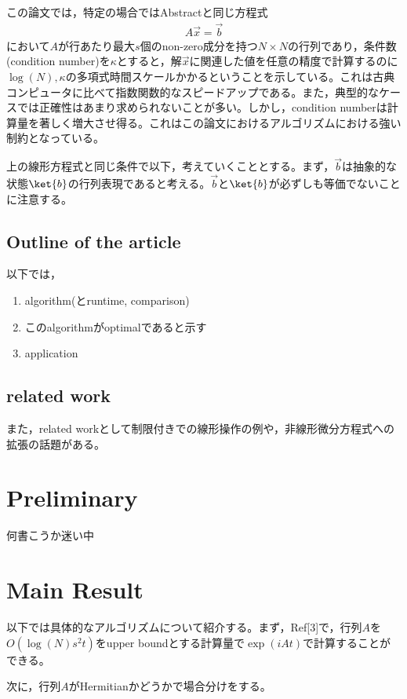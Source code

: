 \documentclass[b5paper,papersize,fleqn]{jsarticle}
\begin{document}
この論文では，特定の場合ではAbstractと同じ方程式
\begin{eqnarray}
  A\vec{x} = \vec{b}
\end{eqnarray}
において$A$が行あたり最大$s$個のnon-zero成分を持つ$N\times N$の行列であり，条件数(condition number)を$\kappa $とすると，解$\vec{x}$に関連した値を任意の精度で計算するのに$\log(N),\kappa $の多項式時間スケールかかるということを示している。これは古典コンピュータに比べて指数関数的なスピードアップである。また，典型的なケースでは正確性はあまり求められないことが多い。しかし，condition numberは計算量を著しく増大させ得る。これはこの論文におけるアルゴリズムにおける強い制約となっている。

上の線形方程式と同じ条件で以下，考えていくこととする。まず，$\vec{b}$は抽象的な状態$\ket{b}$の行列表現であると考える。$\vec{b}$と$\ket{b}$が必ずしも等価でないことに注意する。

\subsection{Outline of the article}

以下では，
\begin{enumerate}
  \item algorithm(とruntime, comparison)
  \item このalgorithmがoptimalであると示す
  \item application
\end{enumerate}

\subsection{related work}

また，related workとして制限付きでの線形操作の例や，非線形微分方程式への拡張の話題がある。

\section{Preliminary}
何書こうか迷い中


\section{Main Result}
以下では具体的なアルゴリズムについて紹介する。まず，Ref[3]で，行列$A$を$O(\log(N)s^2t)$をupper boundとする計算量で$\exp(iAt)$で計算することができる。

次に，行列$A$がHermitianかどうかで場合分けをする。
\end{document}
